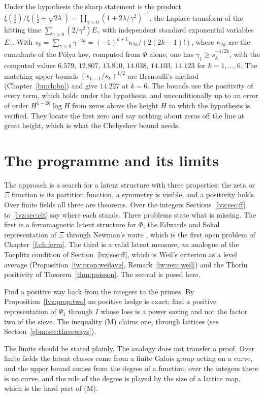 Under the hypothesis the sharp statement is the product $\xi(\frac12)/\xi(\frac12+\sqrt{2\lambda})=\prod_{\gamma>0}(1+2\lambda/\gamma^2)^{-1}$, the Laplace transform of the hitting time $\sum_{\gamma>0}(2/\gamma^2)E_\gamma$ with independent standard exponential variables $E_\gamma$. With $s_k=\sum_{\gamma>0}\gamma^{-2k}=(-1)^{k+1}\kappa_{2k}/(2(2k-1)!)$, where $\kappa_{2k}$ are the cumulants of the P\'olya law, computed from $\Phi$ alone, one has $\gamma_1\ge s_k^{-1/2k}$, with the computed values $6.579$, $12.807$, $13.810$, $14.038$, $14.103$, $14.123$ for $k=1,\dots,6$. The matching upper bounds $(s_{k-1}/s_k)^{1/2}$ are Bernoulli's method (Chapter~\ref{bn:ch:bn}) and give $14.227$ at $k=6$. The bounds use the positivity of every term, which holds under the hypothesis, and unconditionally up to an error of order $H^{1-2k}\log H$ from zeros above the height $H$ to which the hypothesis is verified. They locate the first zero and say nothing about zeros off the line at great height, which is what the Chebyshev bound needs.


\section{The programme and its limits}\label{lvz:sec:prog}

The approach is a search for a latent structure with three properties: the zeta or $\Xi$ function is its partition function, a symmetry is visible, and a positivity holds. Over finite fields all three are theorems. Over the integers Sections~\ref{lvz:sec:ff} to~\ref{lvz:sec:clt} say where each stands.
Three problems state what is missing. The first is a ferromagnetic latent structure for $\Phi$, the Edwards and Sokal representation of $\Xi$ through Newman's route \cite{Newman1976}, which is the first open problem of Chapter~\ref{f:ch:ferro}. The third is a valid latent measure, an analogue of the Toeplitz condition of Section~\ref{lvz:sec:ff}, which is Weil's criterion as a level average (Proposition~\ref{iw:prop:weilavg}, Remark~\ref{iw:rem:weil}) and the Thorin positivity of Theorem~\ref{thm:poisson}. The second is posed here.

\begin{problem}\label{lvz:prob:L2}
Find a positive way back from the integers to the primes. By Proposition~\ref{lvz:prop:two} no positive hedge is exact; find a positive representation of $\Psi_1$ through $I$ whose loss is a power saving and not the factor two of the sieve. The inequality (M) claims one, through lattices (see Section~\ref{gbm:sec:threeways}).
\end{problem}

The limits should be stated plainly. The analogy does not transfer a proof. Over finite fields the latent classes come from a finite Galois group acting on a curve, and the upper bound comes from the degree of a function; over the integers there is no curve, and the role of the degree is played by the size of a lattice map, which is the hard part of (M).

